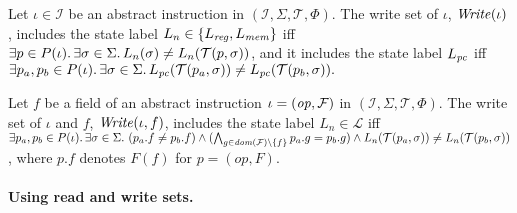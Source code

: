 \begin{definition}\label{def:write-set}
  Let $\iota\in\mathcal{I}$ be an abstract instruction in $(\mathcal{I}, \Sigma,
  \mathcal{T}, \Phi)$. The \textup{write set} of $\iota$, $\mathit{Write}(\iota)$,
  includes the state label $L_n \in \{ L_\mathit{reg}, L_\mathit{mem} \}$ iff 
  $
    \exists p\in P(\iota).\, 
    \exists \sigma \in\Sigma.\, 
    L_n(\sigma) \neq L_n(\mathcal{T}(p,\sigma))
  $, 
  and it includes the state label $L_\mathit{pc}$ iff 
  $
    \exists p_a, p_b\in P(\iota).\, 
    \exists \sigma \in\Sigma.\,
    L_\mathit{pc}(\mathcal{T}(p_a,\sigma)) \neq L_\mathit{pc}(\mathcal{T}(p_b,\sigma)).
  $\tighten
\end{definition}

\begin{definition}\label{def:field-set}
  Let $f$ be a field of an abstract instruction $\iota =
  (\mathit{op},\mathcal{F})$ in $(\mathcal{I}, \Sigma, \mathcal{T}, \Phi)$. The
  \textup{write set} of $\iota$ and $f$, $\mathit{Write}(\iota, f)$, includes
  the state label $L_n \in \mathcal{L}$ iff 
  $
    \exists p_a, p_b\in\prog{\iota}.\, 
    \exists \sigma \in\Sigma.\ 
    (p_a.f \neq p_b.f) \wedge
    (\bigwedge_{g\in\mathid{dom}(\mathcal{F})\setminus\{f\}} p_a.g = p_b.g) \wedge
    \Get{L_n}{\mathcal{T}(p_a,\sigma)} \neq \Get{L_n}{\mathcal{T}(p_b,\sigma)}
  $, where $p.f$ denotes $F(f)$ for $p = (op, F)$. 
\end{definition}






\paragraph{Using read and write sets.}  


